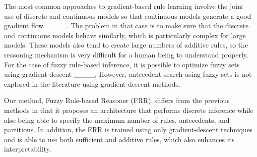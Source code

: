 The most common approaches to gradient-based rule learning involve the joint use of discrete and continuous models so that continuous models generate a good gradient flow ____. The problem in that case is to make sure that the discrete and continuous models behave similarly, which is particularly complex for large models. These models also tend to create large numbers of additive rules, so the reasoning mechanism is very difficult for a human being to understand properly. For the case of fuzzy rule-based inference, it is possible to optimize fuzzy sets using gradient descent ____. However, antecedent search using fuzzy sets is not explored in the literature using gradient-descent methods.

Our method, Fuzzy Rule-based Reasoner (FRR), differs from the previous methods in that it proposes an architecture that performs discrete inference while also being able to specify the maximum number of rules, antecedents, and partitions. In addition, the FRR is trained using only gradient-descent techniques and is able to use both sufficient and additive rules, which also enhances its interpretability.